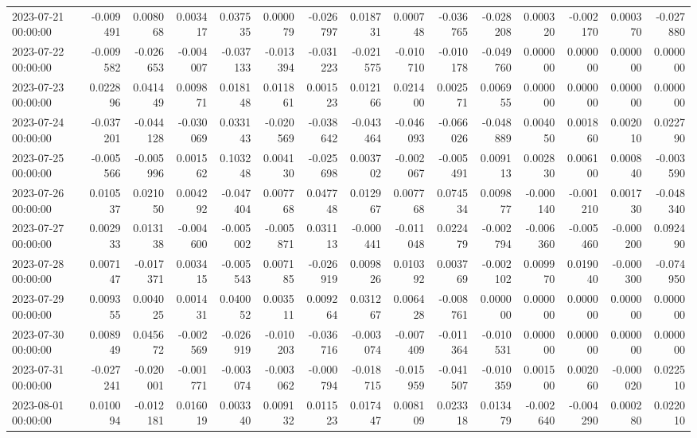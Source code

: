 \begin{tabular}{lrrrrrrrrrrrrrr}
2023-07-21 00:00:00 & -0.009491 & 0.008068 & 0.003417 & 0.037535 & 0.000079 & -0.026797 & 0.018731 & 0.000748 & -0.036765 & -0.028208 & 0.000320 & -0.002170 & 0.000370 & -0.027880 \\
2023-07-22 00:00:00 & -0.009582 & -0.026653 & -0.004007 & -0.037133 & -0.013394 & -0.031223 & -0.021575 & -0.010710 & -0.010178 & -0.049760 & 0.000000 & 0.000000 & 0.000000 & 0.000000 \\
2023-07-23 00:00:00 & 0.022896 & 0.041449 & 0.009871 & 0.018148 & 0.011861 & 0.001523 & 0.012166 & 0.021400 & 0.002571 & 0.006955 & 0.000000 & 0.000000 & 0.000000 & 0.000000 \\
2023-07-24 00:00:00 & -0.037201 & -0.044128 & -0.030069 & 0.033143 & -0.020569 & -0.038642 & -0.043464 & -0.046093 & -0.066026 & -0.048889 & 0.004050 & 0.001860 & 0.002010 & 0.022790 \\
2023-07-25 00:00:00 & -0.005566 & -0.005996 & 0.001562 & 0.103248 & 0.004130 & -0.025698 & 0.003702 & -0.002067 & -0.005491 & 0.009113 & 0.002830 & 0.006100 & 0.000840 & -0.003590 \\
2023-07-26 00:00:00 & 0.010537 & 0.021050 & 0.004292 & -0.047404 & 0.007768 & 0.047748 & 0.012967 & 0.007768 & 0.074534 & 0.009877 & -0.000140 & -0.001210 & 0.001730 & -0.048340 \\
2023-07-27 00:00:00 & 0.002933 & 0.013138 & -0.004600 & -0.005002 & -0.005871 & 0.031113 & -0.000441 & -0.011048 & 0.022479 & -0.002794 & -0.006360 & -0.005460 & -0.000200 & 0.092490 \\
2023-07-28 00:00:00 & 0.007147 & -0.017371 & 0.003415 & -0.005543 & 0.007185 & -0.026919 & 0.009826 & 0.010392 & 0.003769 & -0.002102 & 0.009970 & 0.019040 & -0.000300 & -0.074950 \\
2023-07-29 00:00:00 & 0.009355 & 0.004025 & 0.001431 & 0.040052 & 0.003511 & 0.009264 & 0.031267 & 0.006428 & -0.008761 & 0.000000 & 0.000000 & 0.000000 & 0.000000 & 0.000000 \\
2023-07-30 00:00:00 & 0.008949 & 0.045672 & -0.002569 & -0.026919 & -0.010203 & -0.036716 & -0.003074 & -0.007409 & -0.011364 & -0.010531 & 0.000000 & 0.000000 & 0.000000 & 0.000000 \\
2023-07-31 00:00:00 & -0.027241 & -0.020001 & -0.001771 & -0.003074 & -0.003062 & -0.000794 & -0.018715 & -0.015959 & -0.041507 & -0.010359 & 0.001500 & 0.002060 & -0.000020 & 0.022510 \\
2023-08-01 00:00:00 & 0.010094 & -0.012181 & 0.016019 & 0.003340 & 0.009132 & 0.011523 & 0.017447 & 0.008109 & 0.023318 & 0.013479 & -0.002640 & -0.004290 & 0.000280 & 0.022010 \\

\end{tabular}
